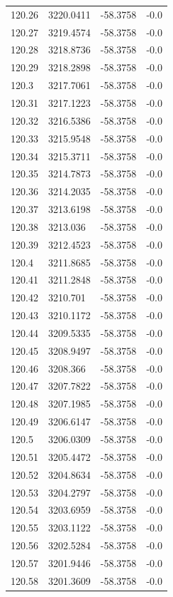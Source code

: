 \begin{table}[H]
\begin{tabular}{llll}
120.26 & 3220.0411 & -58.3758 & -0.0 \\
120.27 & 3219.4574 & -58.3758 & -0.0 \\
120.28 & 3218.8736 & -58.3758 & -0.0 \\
120.29 & 3218.2898 & -58.3758 & -0.0 \\
120.3 & 3217.7061 & -58.3758 & -0.0 \\
120.31 & 3217.1223 & -58.3758 & -0.0 \\
120.32 & 3216.5386 & -58.3758 & -0.0 \\
120.33 & 3215.9548 & -58.3758 & -0.0 \\
120.34 & 3215.3711 & -58.3758 & -0.0 \\
120.35 & 3214.7873 & -58.3758 & -0.0 \\
120.36 & 3214.2035 & -58.3758 & -0.0 \\
120.37 & 3213.6198 & -58.3758 & -0.0 \\
120.38 & 3213.036 & -58.3758 & -0.0 \\
120.39 & 3212.4523 & -58.3758 & -0.0 \\
120.4 & 3211.8685 & -58.3758 & -0.0 \\
120.41 & 3211.2848 & -58.3758 & -0.0 \\
120.42 & 3210.701 & -58.3758 & -0.0 \\
120.43 & 3210.1172 & -58.3758 & -0.0 \\
120.44 & 3209.5335 & -58.3758 & -0.0 \\
120.45 & 3208.9497 & -58.3758 & -0.0 \\
120.46 & 3208.366 & -58.3758 & -0.0 \\
120.47 & 3207.7822 & -58.3758 & -0.0 \\
120.48 & 3207.1985 & -58.3758 & -0.0 \\
120.49 & 3206.6147 & -58.3758 & -0.0 \\
120.5 & 3206.0309 & -58.3758 & -0.0 \\
120.51 & 3205.4472 & -58.3758 & -0.0 \\
120.52 & 3204.8634 & -58.3758 & -0.0 \\
120.53 & 3204.2797 & -58.3758 & -0.0 \\
120.54 & 3203.6959 & -58.3758 & -0.0 \\
120.55 & 3203.1122 & -58.3758 & -0.0 \\
120.56 & 3202.5284 & -58.3758 & -0.0 \\
120.57 & 3201.9446 & -58.3758 & -0.0 \\
120.58 & 3201.3609 & -58.3758 & -0.0 \\

\end{tabular}
\end{table}
